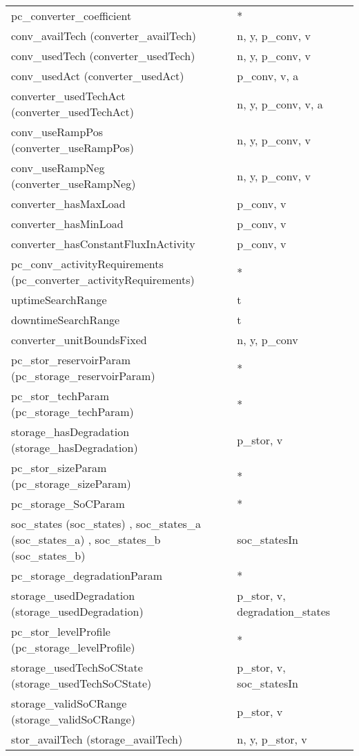 \documentclass[11pt]{article}
\begin{document}
\begin{tabularx}{\textwidth}{| l | l | X |}
pc\_converter\_coefficient & * &  \\ 
conv\_availTech (converter\_availTech)  & n, y, p\_conv, v &  \\ 
conv\_usedTech (converter\_usedTech)  & n, y, p\_conv, v &  \\ 
conv\_usedAct (converter\_usedAct)  & p\_conv, v, a &  \\ 
converter\_usedTechAct (converter\_usedTechAct)  & n, y, p\_conv, v, a &  \\ 
conv\_useRampPos (converter\_useRampPos)  & n, y, p\_conv, v &  \\ 
conv\_useRampNeg (converter\_useRampNeg)  & n, y, p\_conv, v &  \\ 
converter\_hasMaxLoad & p\_conv, v &  \\ 
converter\_hasMinLoad & p\_conv, v &  \\ 
converter\_hasConstantFluxInActivity & p\_conv, v &  \\ 
pc_conv_activityRequirements (pc\_converter\_activityRequirements)  & * &  \\ 
uptimeSearchRange & t &  \\ 
downtimeSearchRange & t &  \\ 
converter\_unitBoundsFixed & n, y, p\_conv &  \\ 
pc_stor_reservoirParam (pc\_storage\_reservoirParam)  & * &  \\ 
pc_stor_techParam (pc\_storage\_techParam)  & * &  \\ 
storage\_hasDegradation (storage\_hasDegradation)  & p\_stor, v &  \\ 
pc_stor_sizeParam (pc\_storage\_sizeParam)  & * &  \\ 
pc\_storage\_SoCParam & * &  \\ 
soc\_states (soc\_states) , soc\_states_a (soc\_states\_a) , soc\_states_b (soc\_states\_b)  & soc\_statesIn &  \\ 
pc\_storage\_degradationParam & * &  \\ 
storage\_usedDegradation (storage\_usedDegradation)  & p\_stor, v, degradation\_states &  \\ 
pc_stor_levelProfile (pc\_storage\_levelProfile)  & * &  \\ 
storage\_usedTechSoCState (storage\_usedTechSoCState)  & p\_stor, v, soc\_statesIn &  \\ 
storage\_validSoCRange (storage\_validSoCRange)  & p\_stor, v &  \\ 
stor\_availTech (storage\_availTech)  & n, y, p\_stor, v &  \\ 

\end{tabularx}
\end{document}
